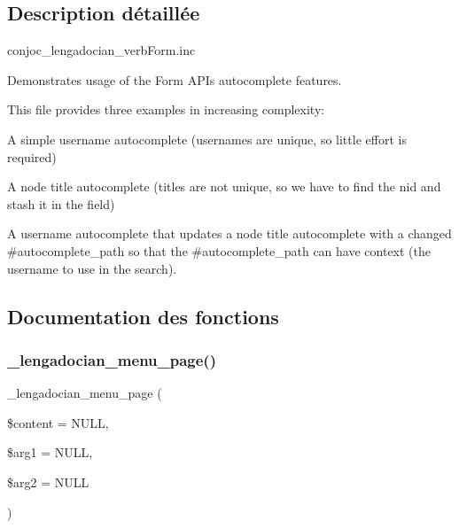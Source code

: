 \subsection{Description détaillée}
conjoc\+\_\+lengadocian\+\_\+verb\+Form.\+inc

Demonstrates usage of the Form A\+PI\textquotesingle{}s autocomplete features.

This file provides three examples in increasing complexity\+:
\begin{DoxyItemize}
\item A simple username autocomplete (usernames are unique, so little effort is required)
\item A node title autocomplete (titles are not unique, so we have to find the nid and stash it in the field)
\item A username autocomplete that updates a node title autocomplete with a changed \#autocomplete\+\_\+path so that the \#autocomplete\+\_\+path can have context (the username to use in the search). 
\end{DoxyItemize}

\subsection{Documentation des fonctions}
\hypertarget{php_2conjoc__lengadocian__web_form_8inc_a4ffe99e612db8d794975a33aefb781f7}{}\label{php_2conjoc__lengadocian__web_form_8inc_a4ffe99e612db8d794975a33aefb781f7} 
\subsubsection{\texorpdfstring{\+\_\+lengadocian\+\_\+menu\+\_\+page()}{\_lengadocian\_menu\_page()}}
{\footnotesize\ttfamily \+\_\+lengadocian\+\_\+menu\+\_\+page (\begin{DoxyParamCaption}\item[{}]{\$content = {\ttfamily NULL},  }\item[{}]{\$arg1 = {\ttfamily NULL},  }\item[{}]{\$arg2 = {\ttfamily NULL} }\end{DoxyParamCaption})}

